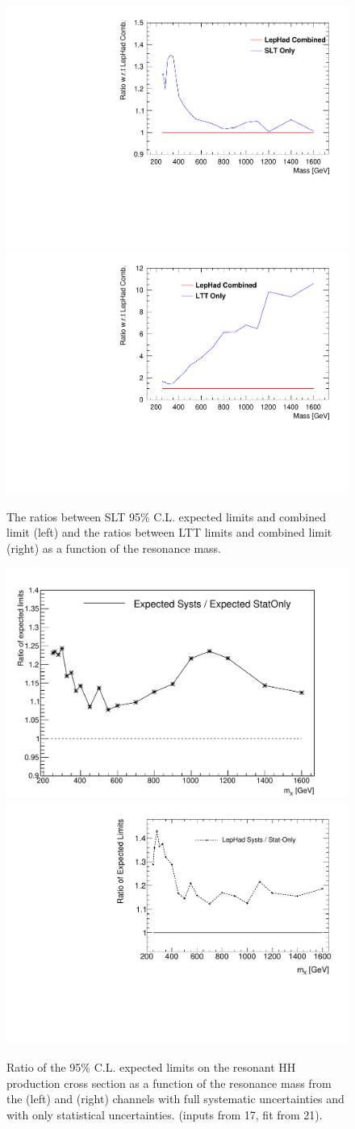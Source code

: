 \begin{figure}
\centering
\includegraphics[width=.45\textwidth]{figures/results/HH/LepHad/SLT_LepHad.pdf}
\includegraphics[width=.45\textwidth]{figures/results/HH/LepHad/LTT_LepHad.pdf}
\caption{The ratios between SLT 95\% C.L. expected limits and \lephad combined limit (left)
and the ratios between LTT limits and \lephad combined limit (right) as a
function of the resonance mass.} 
\label{fig:LepHadLimitsratio}
\end{figure}

\begin{figure}
\centering
\includegraphics[width=.45\textwidth]{figures/results/HH/HadHad/HadHadFit21062021/Limits/ratio_HadHad_21062021_SystsStat}
\includegraphics[width=.45\textwidth]{figures/results/HH/LepHad/ratio_LepHad_SystStat}
\caption{Ratio of the 95\% C.L. expected limits on the resonant HH production cross section as a function of the resonance mass from the \hadhad (left) and \lephad (right) channels with full systematic uncertainties and with only statistical uncertainties. (\hadhad inputs from 17, fit from 21).}
\label{fig:LimitsSysStatRatio}
\end{figure}



